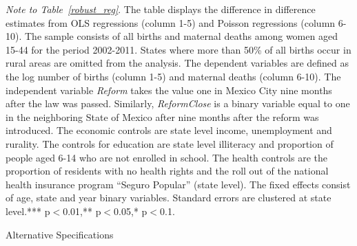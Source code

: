 \documentclass[a4paper, 11pt]{article}
\begin{document}
\begin{spacing}{1.4}
\begin{table}
\begin{threeparttable}
 		
 		\begin{tablenotes} \footnotesize \item \textit{Note to Table~\ref{robust_reg}}. The table displays the difference in difference estimates from OLS regressions (column 1-5) and Poisson regressions (column 6-10). The sample consists of all births and maternal deaths among women aged 15-44 for the period 2002-2011. States where more than 50\% of all births occur in rural areas are omitted from the analysis. The dependent variables are defined as the log number of births (column 1-5) and maternal deaths (column 6-10). The independent variable \textit{Reform} takes the value one in Mexico City nine months after the law was passed. Similarly, \textit{ReformClose} is a binary variable equal to one in the neighboring State of Mexico after nine months after the reform was introduced. The economic controls are state level income, unemployment and rurality. The controls for education are state level illiteracy and proportion of people aged 6-14 who are not enrolled in school. The health controls are the proportion of residents with no health rights and the roll out of the national health insurance program ``Seguro Popular'' (state level). The fixed effects consist of age, state and year binary variables. Standard errors are clustered at state level.*** p$<$0.01,** p$<$0.05,* p$<$0.1.	 
 		\end{tablenotes} 
 	\end{threeparttable}
 \end{table}
 

\begin{table}\centering \caption{Alternative Specifications}\label{altspecRates}
  \begin{threeparttable}
   
      {\footnotesize 	}
 

    


\end{threeparttable}
\end{table}
\end{spacing}
\end{document}
